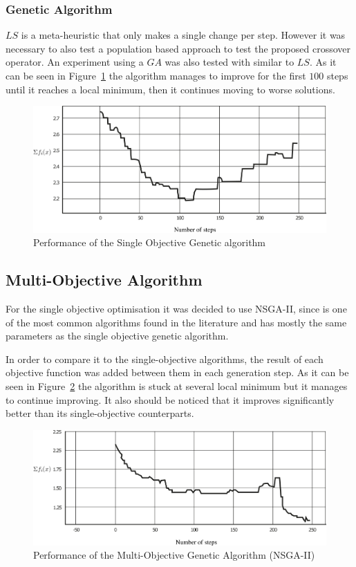 \subsubsection{Genetic Algorithm}

$LS$ is a meta-heuristic that only makes a single change per step. However it was necessary to also test a population based approach to test the proposed crossover operator. An experiment using a $GA$ was also tested with similar to $LS$. As it can be seen in Figure~\ref{fig:genetico} the algorithm manages to improve for the first $100$ steps until it reaches a local minimum, then it continues moving to worse solutions.

\begin{figure}
    \centering
    \includegraphics[width=\textwidth]{images/genetic_algorithm.png}
    \caption{Performance of the Single Objective Genetic algorithm}
    \label{fig:genetico}
\end{figure}

\subsection{Multi-Objective Algorithm}

For the single objective optimisation it was decided to use NSGA-II, since is one of the most common algorithms found in the literature and has mostly the same parameters as the single objective genetic algorithm.

In order to compare it to the single-objective algorithms, the result of each objective function was added between them in each generation step. 
As it can be seen in Figure~\ref{fig:multiobjetivo} the algorithm is stuck at several local minimum but it manages to continue improving. It also should be noticed that it improves significantly better than its single-objective counterparts.

\begin{figure}
    \centering
    \includegraphics[width=\textwidth]{images/multiobjective.png}
    \caption{Performance of the Multi-Objective Genetic Algorithm (NSGA-II)}
    \label{fig:multiobjetivo}
\end{figure}
